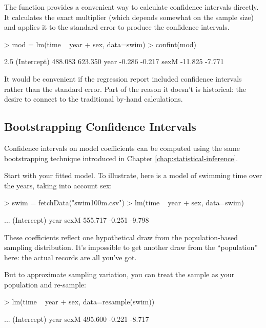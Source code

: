 The  function provides a convenient way to calculate
confidence intervals directly.
It calculates the exact multiplier (which depends somewhat on the
sample size)  and applies it to the standard error to produce the confidence intervals.
\begin{Schunk}
\begin{Sinput}
> mod = lm(time ~ year + sex, data=swim)
> confint(mod)
\end{Sinput}
\begin{Soutput}
              2.5 %  97.5 %
(Intercept) 488.083 623.350
year         -0.286  -0.217
sexM        -11.825  -7.771
\end{Soutput}
\end{Schunk}

It would be convenient if the regression report included confidence
intervals rather than the standard error.  Part of the reason it
doesn't is historical: the desire to connect to the traditional by-hand calculations.



\subsection{Bootstrapping Confidence Intervals}

Confidence intervals on model coefficients can be computed using the
same bootstrapping technique introduced in Chapter \ref{chap:statistical-inference}.

Start with your fitted model. To illustrate, here is a model of
swimming time over the years, taking into account sex:
\begin{Schunk}
\begin{Sinput}
> swim = fetchData("swim100m.csv")
> lm(time ~ year + sex, data=swim)
\end{Sinput}
\begin{Soutput}
...
(Intercept)         year         sexM  
    555.717       -0.251       -9.798  
\end{Soutput}
\end{Schunk}
These coefficients reflect one hypothetical draw from the
population-based sampling
distribution.  It's impossible to get another draw from the
``population'' here: the actual records are all you've got.

But to approximate sampling variation, you can treat the sample as
your population and re-sample:
\begin{Schunk}
\begin{Sinput}
> lm(time ~ year + sex, data=resample(swim))
\end{Sinput}
\begin{Soutput}
...
(Intercept)         year         sexM  
    495.600       -0.221       -8.717  
\end{Soutput}
\end{Schunk}

